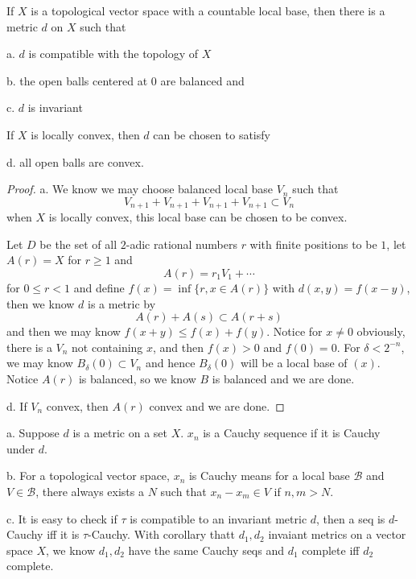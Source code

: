 \begin{theorem}
    If $X$ is a topological vector space with a countable local base, then there is a metric $d$ on $X$ such that\par
    a. $d$ is compatible with the topology of $X$\par
    b. the open balls centered at $0$ are balanced and\par
    c. $d$ is invariant\par
    If $X$ is locally convex, then $d$ can be chosen to satisfy\par
    d. all open balls are convex.
\end{theorem}
\begin{proof}
    a. We know we may choose balanced local base $V_n$ such that
    \[V_{n+1}+V_{n+1}+V_{n+1}+V_{n+1} \subset V_n\]
    when $X$ is locally convex, this local base can be chosen to be convex.\par
    Let $D$ be the set of all $2$-adic rational numbers $r$ with finite positions to be $1$, let $A(r) = X$ for $r\geq 1$ and
    \[
    A(r) = r_1V_1 + \cdots
    \] 
    for $0\leq r < 1$
    and define $f(x) = \inf\{r, x\in A(r)\}$ with $d(x,y) = f(x-y)$, then we know $d$ is a metric by
    \[A(r)+A(s) \subset A(r+s)\]
    and then we may know $f(x+y) \leq f(x)+f(y)$. Notice for $x\neq 0$ obviously, there is a $V_{n}$ not containing $x$, and then $f(x) > 0$ and $f(0) = 0$. For $\delta < 2^{-n}$, we may know $B_{\delta}(0) \subset V_n$ and hence $B_{\delta} (0)$ will be a local base of $(x)$. Notice $A(r)$ is balanced, so we know $B$ is balanced and we are done.\par
    d. If $V_n$ convex, then $A(r)$ convex and we are done.  
\end{proof}

\begin{definition}
    a. Suppose $d$ is a metric on a set $X$. $x_n$ is a Cauchy sequence if it is Cauchy under $d$.\par
    b. For a topological vector space, $x_n$ is Cauchy means for a local base $\mathcal{B}$ and $V\in\mathcal{B}$, there always exists a $N$ such that $x_n-x_m \in V$ if $n,m>N$.\par
    c. It is easy to check if $\tau$ is compatible to an invariant metric $d$, then a seq is $d$-Cauchy iff it is $\tau$-Cauchy. With corollary thatt $d_1,d_2$ invaiant metrics on a vector space $X$, we know $d_1,d_2$ have the same Cauchy seqs and $d_1$ complete iff $d_2$ complete.
\end{definition}

